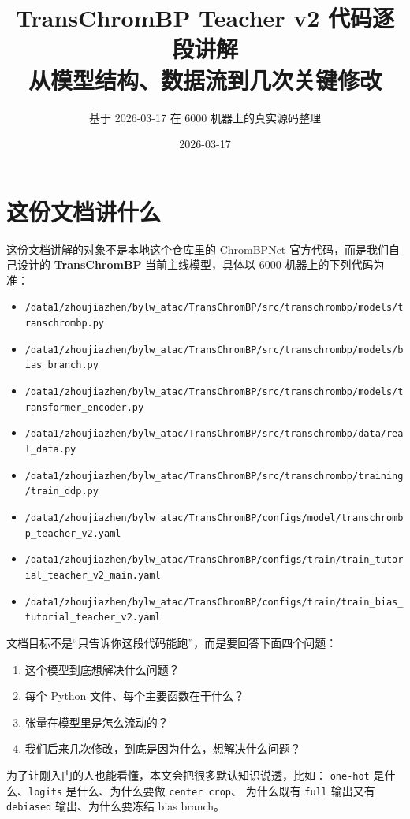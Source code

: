 \documentclass[11pt,a4paper]{ctexart}
\title{TransChromBP Teacher v2 代码逐段讲解\\
\large 从模型结构、数据流到几次关键修改}
\author{基于 2026-03-17 在 6000 机器上的真实源码整理}
\date{2026-03-17}
\begin{document}
\maketitle
\tableofcontents
\newpage

\section{这份文档讲什么}

这份文档讲解的对象不是本地这个仓库里的 ChromBPNet 官方代码，而是我们自己设计的
\textbf{TransChromBP} 当前主线模型，具体以 6000 机器上的下列代码为准：

\begin{itemize}[leftmargin=2em]
\item \texttt{/data1/zhoujiazhen/bylw\_atac/TransChromBP/src/transchrombp/models/transchrombp.py}
\item \texttt{/data1/zhoujiazhen/bylw\_atac/TransChromBP/src/transchrombp/models/bias\_branch.py}
\item \texttt{/data1/zhoujiazhen/bylw\_atac/TransChromBP/src/transchrombp/models/transformer\_encoder.py}
\item \texttt{/data1/zhoujiazhen/bylw\_atac/TransChromBP/src/transchrombp/data/real\_data.py}
\item \texttt{/data1/zhoujiazhen/bylw\_atac/TransChromBP/src/transchrombp/training/train\_ddp.py}
\item \texttt{/data1/zhoujiazhen/bylw\_atac/TransChromBP/configs/model/transchrombp\_teacher\_v2.yaml}
\item \texttt{/data1/zhoujiazhen/bylw\_atac/TransChromBP/configs/train/train\_tutorial\_teacher\_v2\_main.yaml}
\item \texttt{/data1/zhoujiazhen/bylw\_atac/TransChromBP/configs/train/train\_bias\_tutorial\_teacher\_v2.yaml}
\end{itemize}

文档目标不是“只告诉你这段代码能跑”，而是要回答下面四个问题：

\begin{enumerate}[leftmargin=2em]
\item 这个模型到底想解决什么问题？
\item 每个 Python 文件、每个主要函数在干什么？
\item 张量在模型里是怎么流动的？
\item 我们后来几次修改，到底是因为什么，想解决什么问题？
\end{enumerate}

为了让刚入门的人也能看懂，本文会把很多默认知识说透，比如：
\texttt{one-hot} 是什么、\texttt{logits} 是什么、为什么要做 \texttt{center crop}、
为什么既有 \texttt{full} 输出又有 \texttt{debiased} 输出、为什么要冻结 bias branch。
\end{document}
